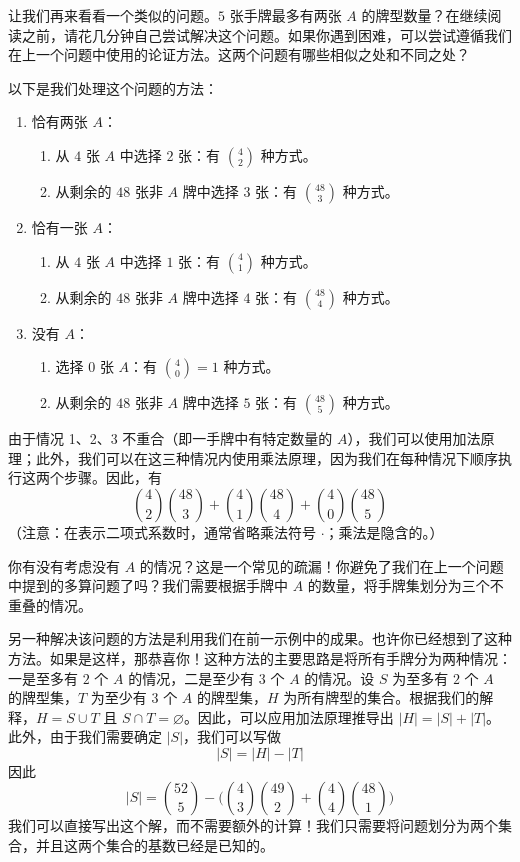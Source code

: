 \begin{example}[最多两张 $A$]

    让我们再来看看一个类似的问题。$5$ 张手牌最多有两张 $A$ 的牌型数量？在继续阅读之前，请花几分钟自己尝试解决这个问题。如果你遇到困难，可以尝试遵循我们在上一个问题中使用的论证方法。这两个问题有哪些相似之处和不同之处？

    以下是我们处理这个问题的方法：
    \begin{enumerate}
        \item 恰有两张 $A$：
              \begin{enumerate}[label=(\alph*)]
                  \item 从 $4$ 张 $A$ 中选择 $2$ 张：有 ${4 \choose 2}$ 种方式。
                  \item 从剩余的 $48$ 张非 $A$ 牌中选择 $3$ 张：有 ${48 \choose 3}$ 种方式。
              \end{enumerate}
        \item 恰有一张 $A$：
              \begin{enumerate}[label=(\alph*)]
                  \item 从 $4$ 张 $A$ 中选择 $1$ 张：有 ${4 \choose 1}$ 种方式。
                  \item 从剩余的 $48$ 张非 $A$ 牌中选择 $4$ 张：有 ${48 \choose 4}$ 种方式。
              \end{enumerate}
        \item 没有 $A$：
              \begin{enumerate}[label=(\alph*)]
                  \item 选择 $0$ 张 $A$：有 ${4 \choose 0}=1$ 种方式。
                  \item 从剩余的 $48$ 张非 $A$ 牌中选择 $5$ 张：有 ${48 \choose 5}$ 种方式。
              \end{enumerate}
    \end{enumerate}
    由于情况 1、2、3 不重合（即一手牌中有特定数量的 $A$），我们可以使用加法原理；此外，我们可以在这三种情况内使用乘法原理，因为我们在每种情况下顺序执行这两个步骤。因此，有
    \[{4 \choose 2}{48 \choose 3}+{4 \choose 1}{48 \choose 4}+{4 \choose 0}{48 \choose 5}\]
    （注意：在表示二项式系数时，通常省略乘法符号 $\cdot$；乘法是隐含的。）

    你有没有考虑没有 $A$ 的情况？这是一个常见的疏漏！你避免了我们在上一个问题中提到的多算问题了吗？我们需要根据手牌中 $A$ 的数量，将手牌集划分为三个不重叠的情况。

    另一种解决该问题的方法是利用我们在前一示例中的成果。也许你已经想到了这种方法。如果是这样，那恭喜你！这种方法的主要思路是将所有手牌分为两种情况：一是至多有 $2$ 个 $A$ 的情况，二是至少有 $3$ 个 $A$ 的情况。设 $S$ 为至多有 $2$ 个 $A$ 的牌型集，$T$ 为至少有 $3$ 个 $A$ 的牌型集，$H$ 为所有牌型的集合。根据我们的解释，$H = S \cup T$ 且 $S \cap T = \varnothing$。因此，可以应用加法原理推导出 $|H| = |S| + |T|$。此外，由于我们需要确定 $|S|$，我们可以写做
    \[|S| = |H| - |T|\]
    因此
    \[|S| = {52 \choose 5}-\Bigg({4 \choose 3}{49 \choose 2}+{4 \choose 4}{48 \choose 1}\Bigg)\]
    我们可以直接写出这个解，而不需要额外的计算！我们只需要将问题划分为两个集合，并且这两个集合的基数已经是已知的。


\end{example}
